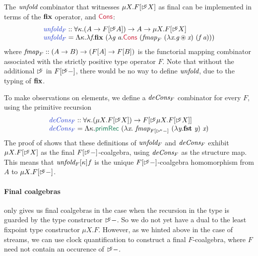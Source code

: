 The $\textit{unfold}$ combinator that witnesses $\mu X. F[\mathord{\rhd\kern-0.4em^{\kappa}}
X]$ as final can be implemented in terms of the $\textbf{fix}$ operator,
and $\cons{Cons}$:
\begin{displaymath}
  \begin{array}[t]{l}
    \defn{unfold$_F$} :: \forall \kappa. (A \to F[\delay\kappa A]) \to A \to \mu X. F[\delay\kappa X] \\
    \defn{unfold$_F$} = \Lambda \kappa.\lambda \ident{f}. \kw{fix}\ (\lambda \ident{g}\ \ident{a}. \cons{Cons}\ (\ident{fmap}_F\ (\lambda \ident{x}. \ident{g} \circledast \ident{x})\ (\ident{f}\ \ident{a})))
  \end{array}
\end{displaymath}
where $\textit{fmap}_F :: (A \to B) \to (F[A] \to F[B])$ is the
functorial mapping combinator associated with the strictly positive
type operator $F$. Note that without the additional $\mathord{\rhd\kern-0.4em^{\kappa}}$ in
$F[\mathord{\rhd\kern-0.4em^{\kappa}} -]$, there would be no way to define $\textit{unfold}$,
due to the typing of $\textbf{fix}$.

To make observations on elements, we define a $\textit{deCons$_F$}$
combinator for every $F$, using the primitive recursion
\begin{displaymath}
  \begin{array}{l}
    \defn{deCons$_F$} :: \forall \kappa. (\mu X. F[\delay\kappa X]) \to F[\delay\kappa \mu X. F[\delay\kappa X]] \\
    \defn{deCons$_F$} = \Lambda \kappa. \elim{primRec}\ (\lambda \ident{x}.\ \ident{fmap}_{F[\delayX\kappa-]}\ (\lambda \ident{y}.\kw{fst}\ \ident{y})\ \ident{x})
  \end{array}
\end{displaymath}
The proof of  shows that these
definitions of $\textit{unfold$_F$}$ and $\textit{deCons$_F$}$ exhibit
$\mu X. F[\mathord{\rhd\kern-0.4em^{\kappa}} X]$ as the final $F[\mathord{\rhd\kern-0.4em^{\kappa}}-]$-coalgebra,
using $\textit{deCons$_F$}$ as the structure map. This means that
$\textit{unfold$_F$}[\kappa] f$ is the unique $F[\mathord{\rhd\kern-0.4em^{\kappa}}-]$-coalgebra
homomorphism from $A$ to $\mu X. F[\mathord{\rhd\kern-0.4em^{\kappa}}-]$.

\paragraph{Final coalgebras}
 only gives us final coalgebras in
the case when the recursion in the type is guarded by the type
constructor $\mathord{\rhd\kern-0.4em^{\kappa}}-$. So we do not yet have a dual to the least
fixpoint type constructor $\mu X. F$. However, as we hinted above in
the case of streams, we can use clock quantification to construct a
final $F$-coalgebra, where $F$ need not contain an occurence of
$\mathord{\rhd\kern-0.4em^{\kappa}}-$.


